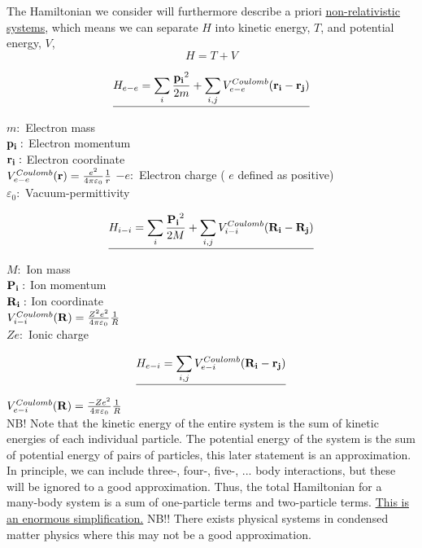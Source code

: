 \noindent The Hamiltonian we consider will furthermore describe a priori \uline{non-relativistic systems}, which means we can separate $H$ into kinetic energy, $T$, and potential energy, $V$,
\begin{equation}
	H = T+V
\end{equation}

\begin{equation}
	\underline{H_{e-e}= \sum_{i} \frac{\vb{p_i}^2}{2m}+ \sum_{i,j} V_{e-e}^{Coulomb} (\vb{r_i}-\vb{r_j})}
\end{equation}

\noindent $m:$ Electron mass\\
$\vb{p_i}:$ Electron momentum\\
$\vb{r_i}:$ Electron coordinate\\
$V_{e-e}^{Coulomb}(\vb{r})= \frac{e^2}{4\pi \varepsilon_0} \frac{1}{r}$
$-e:$ Electron charge ( $e$ defined as positive)\\
$\varepsilon_0:$ Vacuum-permittivity 

\begin{equation}
	\underline{H_{i-i}= \sum_{i} \frac{\vb{P_i}^2}{2M}+ \sum_{i,j} V_{i-i}^{Coulomb} (\vb{R_i}-\vb{R_j})}
\end{equation}

\noindent $M:$ Ion mass\\
$\vb{P_i}:$ Ion momentum\\
$\vb{R_i}:$ Ion coordinate\\
$V_{i-i}^{Coulomb}(\vb{R})= \frac{Z^2e^2}{4\pi \varepsilon_0} \frac{1}{R}$\\
$Ze:$ Ionic charge

\begin{equation}
\underline{H_{e-i}= \sum_{i,j} V_{e-i}^{Coulomb} (\vb{R_i}-\vb{r_j})}
\end{equation}

\noindent $V_{e-i}^{Coulomb}(\vb{R})= \frac{-Ze^2}{4\pi \varepsilon_0} \frac{1}{R}$\\

\noindent NB! Note that the kinetic energy of the entire system is the sum of kinetic energies of each individual particle. The potential energy of the system is the sum of potential energy of pairs of particles, this later statement is an approximation. In principle, we can include three-, four-, five-, ... body interactions, but these will be ignored to a good approximation.
Thus, the total Hamiltonian for a many-body system is a sum of one-particle terms and two-particle terms. \uline{This is an enormous simplification.} NB!! There exists physical systems in condensed matter physics where this may not be a good approximation.\\
\linebreak


